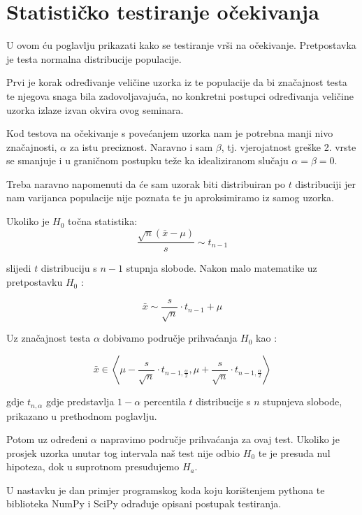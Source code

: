 \chapter{Statističko testiranje očekivanja}

U ovom ću poglavlju prikazati kako se testiranje vrši na očekivanje. Pretpostavka je testa normalna distribucije populacije.

Prvi je korak određivanje veličine uzorka iz te populacije da bi značajnost testa te njegova snaga bila zadovoljavajuća, no konkretni postupci određivanja veličine uzorka izlaze izvan okvira ovog seminara. 

Kod testova na očekivanje s povećanjem uzorka nam je potrebna manji nivo značajnosti, $\alpha$ za istu preciznost. Naravno i sam $\beta$, tj. vjerojatnost greške 2. vrste se smanjuje i u graničnom postupku teže ka idealiziranom slučaju $\alpha = \beta = 0$.

Treba naravno napomenuti da će sam uzorak biti distribuiran po $t$ distribuciji jer nam varijanca populacije nije poznata te ju aproksimiramo iz samog uzorka.  

Ukoliko je $H_0$ točna statistika: \[\frac{\sqrt{n} (\bar{x} - \mu)}{s} \sim t_{n-1}\]

slijedi $t$ distribuciju s $n-1$ stupnja slobode. Nakon malo matematike uz pretpostavku $H_0$ \cite{engstat} \cite{vis3}:

\[
\bar{x} \sim \frac{s}{\sqrt{n}} \cdot t_{n-1} + \mu
\]

Uz značajnost testa $\alpha$ dobivamo područje prihvaćanja $H_0$ kao \cite{matstat}:

\[
\bar{x} \in \left<\mu - \frac{s}{\sqrt{n}} \cdot t_{n-1, \frac{\alpha}{2}}, \mu + \frac{s}{\sqrt{n}} \cdot t_{n-1, \frac{\alpha}{2}} \right>
\]

gdje $t_{n, \alpha}$ gdje predstavlja $1-\alpha$ percentila $t$ distribucije s $n$ stupnjeva slobode, prikazano u prethodnom poglavlju.

Potom uz određeni $\alpha$ napravimo područje prihvaćanja za ovaj test. Ukoliko je prosjek uzorka unutar tog intervala naš test nije odbio $H_0$ te je presuda nul hipoteza, dok u suprotnom presuđujemo $H_a$.

U nastavku je dan primjer programskog koda koju korištenjem pythona te biblioteka NumPy i SciPy odrađuje opisani postupak testiranja.

